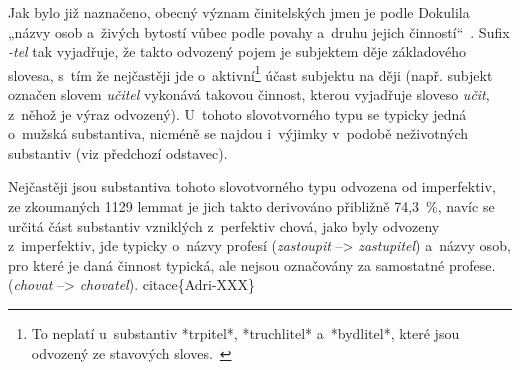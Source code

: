 Jak bylo již naznačeno, obecný význam činitelských jmen je podle
Dokulila „názvy osob a~živých bytostí vůbec podle povahy a~druhu jejich
činností``~\parencite[17]{dokulil67}. Sufix \emph{-tel} tak vyjadřuje,
že takto odvozený pojem je subjektem děje základového slovesa, s~tím že
nejčastěji jde o~aktivní\footnote{To neplatí u~substantiv *trpitel*, *truchlitel* a~*bydlitel*, které jsou odvozený ze stavových sloves.~\parencite[17]{dokulil67}}
účast subjektu na ději (např. subjekt označen slovem \emph{učitel}
vykonává takovou činnost, kterou vyjadřuje sloveso \emph{učit}, z~něhož
je výraz odvozený). U~tohoto slovotvorného typu se typicky jedná
o~mužská substantiva, nicméně se najdou i~výjimky v~podobě neživotných
substantiv (viz předchozí odstavec).~\parencite{simandl2016}

Nejčastěji jsou substantiva tohoto slovotvorného typu odvozena od
imperfektiv, ze zkoumaných 1129 lemmat je jich takto derivováno
přibližně 74,3~\%, navíc se určitá část substantiv vzniklých z~perfektiv
chová, jako byly odvozeny z~imperfektiv, jde typicky o~názvy profesí
(\emph{zastoupit} --\textgreater{} \emph{zastupitel}) a~názvy osob, pro
které je daná činnost typická, ale nejsou označovány za samostatné
profese. (\emph{chovat} --\textgreater{} \emph{chovatel}).
citace\{Adri-XXX\}
